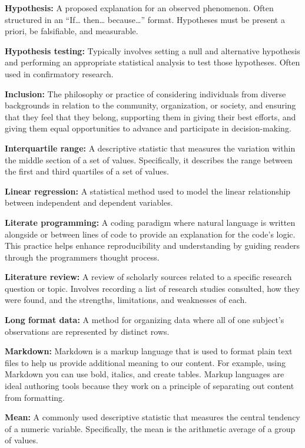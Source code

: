 \documentclass[
]{book}
\begin{document}
\textbf{Hypothesis:} A proposed explanation for an observed phenomenon. Often structured in an ``If\ldots{} then\ldots{} because\ldots'' format. Hypotheses must be present a priori, be falsifiable, and measurable.

\textbf{Hypothesis testing:} Typically involves setting a null and alternative hypothesis and performing an appropriate statistical analysis to test those hypotheses. Often used in confirmatory research.

\textbf{Inclusion:} The philosophy or practice of considering individuals from diverse backgrounds in relation to the community, organization, or society, and ensuring that they feel that they belong, supporting them in giving their best efforts, and giving them equal opportunities to advance and participate in decision-making.

\textbf{Interquartile range:} A descriptive statistic that measures the variation within the middle section of a set of values. Specifically, it describes the range between the first and third quartiles of a set of values.

\textbf{Linear regression:} A statistical method used to model the linear relationship between independent and dependent variables.

\textbf{Literate programming:} A coding paradigm where natural language is written alongside or between lines of code to provide an explanation for the code's logic. This practice helps enhance reproducibility and understanding by guiding readers through the programmers thought process.

\textbf{Literature review:} A review of scholarly sources related to a specific research question or topic. Involves recording a list of research studies consulted, how they were found, and the strengths, limitations, and weaknesses of each.

\textbf{Long format data:} A method for organizing data where all of one subject's observations are represented by distinct rows.

\textbf{Markdown:} Markdown is a markup language that is used to format plain text files to help us provide additional meaning to our content. For example, using Markdown you can use bold, italics, and create tables. Markup languages are ideal authoring tools because they work on a principle of separating out content from formatting.

\textbf{Mean:} A commonly used descriptive statistic that measures the central tendency of a numeric variable. Specifically, the mean is the arithmetic average of a group of values.
\end{document}
